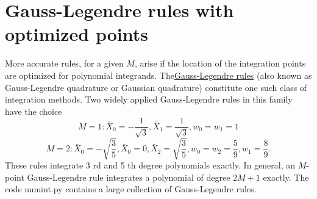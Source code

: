 \documentclass[../main.tex]{subfiles}
\begin{document}
	\section[Gauss-Legendre rules with optimized points]{Gauss-Legendre rules with optimized points}
	\label{sec:sec_7_2}
	More accurate rules, for a given $M$, arise if the location of the integration points are optimized for polynomial integrands. The\href{https://en.wikipedia.org/wiki/Gaussian_quadrature}{Gauss-Legendre rules} (also known as Gauss-Legendre quadrature or Gaussian quadrature) constitute one such class of integration methods. Two widely applied Gauss-Legendre rules in this family have the choice
	\begin{equation}\label{eqa104}
		M=1: \bar{X}_{0}=-\frac{1}{\sqrt{3}}, \bar{X}_{1}=\frac{1}{\sqrt{3}}, w_{0}=w_{1}=1
	\end{equation}
	\begin{equation}\label{eqa105}
		M=2: \bar{X}_{0}=-\sqrt{\frac{3}{5}}, \bar{X}_{0}=0, \bar{X}_{2}=\sqrt{\frac{3}{5}}, w_{0}=w_{2}=\frac{5}{9}, w_{1}=\frac{8}{9}.
	\end{equation}
	These rules integrate 3 rd and 5 th degree polynomials exactly. In general, an $M$-point Gauss-Legendre rule integrates a polynomial of degree $2 M+1$ exactly. The code numint.py contains a large collection of Gauss-Legendre rules.
	
\clearpage
\end{document}
